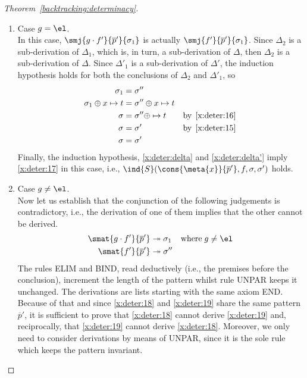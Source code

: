 \begin{proof}[Theorem~\ref{backtracking:determinacy}]
\begin{enumerate}
\begin{enumerate}
       \item Case \(g = \el\).\\ In this case, \(\smj{g \cdot
         f'}{\overline{p}'}{\sigma_1}\) is actually
         \(\smj{f'}{\overline{p}'}{\sigma_1}\). Since \(\Delta_2\) is
         a sub\hyp{}derivation of \(\Delta_1\), which is, in turn, a
         sub\hyp{}derivation of \(\Delta\), then \(\Delta_2\) is a
         sub\hyp{}derivation of \(\Delta\). Since \(\Delta'_1\) is a
         sub\hyp{}derivation of \(\Delta'\), the induction hypothesis
         holds for both the conclusions of \(\Delta_2\) and
         \(\Delta'_1\), so
         \begin{align}
           \sigma_1 &= \sigma''\notag\\
           \sigma_1 \oplus x \mapsto t &= \sigma'' \oplus x \mapsto
           t\notag\\
           \sigma &= \sigma'' \oplus \mapsto t
           & \text{by} \,\; \eqref{x:deter:16}\notag\\
           \sigma &= \sigma'
           & \text{by} \,\; \text{\ref{x:deter:15}}\notag\\
           \sigma &= \sigma' \label{x:deter:17}
         \end{align}
         Finally, the induction hypothesis, \eqref{x:deter:delta} and
         \eqref{x:deter:delta'} imply \eqref{x:deter:17} in this case,
         i.e., \(\ind{S}(\cons{\meta{x}}{\overline{p}'}, f, \sigma,
         \sigma')\) holds.

       \item Case \(g \neq \el\).\\ Now let us establish that the
         conjunction of the following judgements is contradictory,
         i.e., the derivation of one of them implies that the other
         cannot be derived.
         \begin{align}
             \smat{g \cdot f'}{\overline{p}'} 
           &\twoheadrightarrow \sigma_1 \label{x:deter:18} 
           & \text{where} \; g \neq \el\\
             \smat{f'}{\overline{p}'}
           &\twoheadrightarrow \sigma'' \label{x:deter:19}
         \end{align}
         The rules \textsf{ELIM} and \textsf{BIND}, read deductively
         (i.e., the premises before the conclusion), increment the
         length of the pattern whilst rule \textsf{UNPAR} keeps it
         unchanged. The derivations are lists starting with the same
         axiom \textsf{END}. Because of that and since
         \eqref{x:deter:18} and \eqref{x:deter:19} share the same
         pattern \(\overline{p}'\), it is sufficient to prove that
         \eqref{x:deter:18} cannot derive \eqref{x:deter:19} and,
         reciprocally, that \eqref{x:deter:19} cannot derive
         \eqref{x:deter:18}. Moreover, we only need to consider
         derivations by means of \textsf{UNPAR}, since it is the sole
         rule which keeps the pattern invariant.
         \begin{enumerate}


\end{enumerate}
\end{enumerate}
\end{enumerate}
\end{proof}
